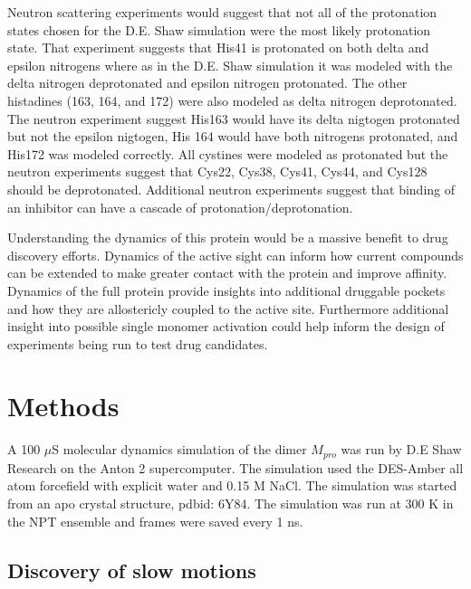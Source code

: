 \documentclass{biophys-new}
\begin{document}
Neutron scattering experiments would suggest that not all of the protonation states chosen for the D.E. Shaw simulation were the most likely protonation state.\cite{kneller2020unusual} That experiment suggests that His41 is protonated on both delta and epsilon nitrogens where as in the D.E. Shaw simulation it was modeled with the delta nitrogen deprotonated and epsilon nitrogen protonated. The other histadines (163, 164, and 172) were also modeled as delta nitrogen deprotonated. The neutron experiment suggest His163 would have its delta nigtogen protonated but not the epsilon nigtogen, His 164 would have both nitrogens protonated, and His172 was modeled correctly. All cystines were modeled as protonated but the neutron experiments suggest that Cys22, Cys38, Cys41, Cys44, and Cys128 should be deprotonated. Additional neutron experiments suggest that binding of an inhibitor can have a cascade of protonation/deprotonation.\cite{kneller2021direct}

Understanding the dynamics of this protein would be a massive benefit to drug discovery efforts. Dynamics of the active sight can inform how current compounds can be extended to make greater contact with the protein and improve affinity. Dynamics of the full protein provide insights into additional druggable pockets and how they are allostericly coupled to the active site. Furthermore additional insight into possible single monomer activation could help inform the design of experiments being run to test drug candidates.

\section*{Methods}

A 100 $\mu$S molecular dynamics simulation of the dimer $M_{pro}$ was run by D.E Shaw Research on the Anton 2 supercomputer.\cite{shaw2020molecular} The simulation used the DES-Amber all atom forcefield\cite{piana2020development} with explicit water and 0.15 M NaCl. The simulation was started from an apo crystal structure, pdbid: 6Y84. The simulation was run at 300 K in the NPT ensemble and frames were saved every 1 ns.

\subsection*{Discovery of slow motions}
\end{document}
